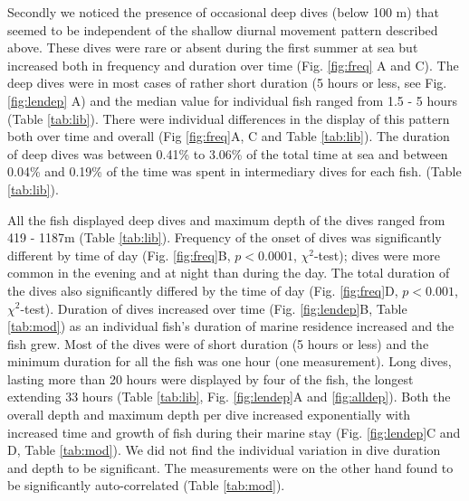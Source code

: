 Secondly we noticed the presence of occasional deep dives (below 100 m) that seemed to be independent of the shallow diurnal movement pattern described above. These dives were rare or absent during the first summer at sea but increased both in frequency and duration over time (Fig. \ref{fig:freq} A and C). 
The deep dives were in most cases of rather short duration (5 hours or less, see Fig. \ref{fig:lendep} A) and the median value for individual fish ranged from 1.5 - 5 hours (Table \ref{tab:lib}). 
There were individual differences in the display of this pattern both over time and overall (Fig \ref{fig:freq}A, C and Table \ref{tab:lib}). 
The duration of deep dives was between 0.41\% to 3.06\% of the total time at sea and between 0.04\% and 0.19\% of the time was spent in intermediary dives for each fish. (Table \ref{tab:lib}).

All the fish displayed deep dives and maximum depth of the dives ranged from 419 - 1187m (Table \ref{tab:lib}). 
Frequency of the onset of dives was significantly different by time of day (Fig. \ref{fig:freq}B, $p < 0.0001$, $\chi^2$-test); dives were more common in the evening and at night than during the day. 
The total duration of the dives also significantly differed by the time of day (Fig. \ref{fig:freq}D, $p < 0.001$, $\chi^2$-test). 
Duration of dives increased over time (Fig. \ref{fig:lendep}B, Table \ref{tab:mod}) as an individual fish's duration of marine residence increased and the fish grew. 
Most of the dives were of short duration (5 hours or less) and the minimum duration for all the fish was one hour (one measurement). 
Long dives, lasting more than 20 hours were displayed by four of the fish, the longest extending 33 hours (Table \ref{tab:lib}, Fig. \ref{fig:lendep}A and \ref{fig:alldep}). 
Both the overall depth and maximum depth per dive increased exponentially with increased time and growth of fish during their marine stay (Fig. \ref{fig:lendep}C and D, Table \ref{tab:mod}).  We did not find the individual variation in dive duration and depth to be significant. The measurements were on the other hand found to be significantly auto-correlated (Table \ref{tab:mod}).

